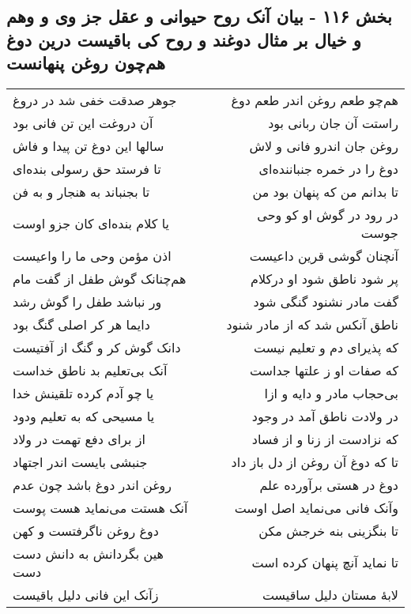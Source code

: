 \begin{center}
\section*{بخش ۱۱۶ - بیان آنک روح حیوانی و عقل جز وی و وهم و خیال بر مثال دوغند و روح کی باقیست درین دوغ هم‌چون روغن پنهانست}
\label{sec:sh116}
\begin{longtable}{l p{0.5cm} r}
جوهر صدقت خفی شد در دروغ
&&
هم‌چو طعم روغن اندر طعم دوغ
\\
آن دروغت این تن فانی بود
&&
راستت آن جان ربانی بود
\\
سالها این دوغ تن پیدا و فاش
&&
روغن جان اندرو فانی و لاش
\\
تا فرستد حق رسولی بنده‌ای
&&
دوغ را در خمره جنباننده‌ای
\\
تا بجنباند به هنجار و به فن
&&
تا بدانم من که پنهان بود من
\\
یا کلام بنده‌ای کان جزو اوست
&&
در رود در گوش او کو وحی جوست
\\
اذن مؤمن وحی ما را واعیست
&&
آنچنان گوشی قرین داعیست
\\
هم‌چنانک گوش طفل از گفت مام
&&
پر شود ناطق شود او درکلام
\\
ور نباشد طفل را گوش رشد
&&
گفت مادر نشنود گنگی شود
\\
دایما هر کر اصلی گنگ بود
&&
ناطق آنکس شد که از مادر شنود
\\
دانک گوش کر و گنگ از آفتیست
&&
که پذیرای دم و تعلیم نیست
\\
آنک بی‌تعلیم بد ناطق خداست
&&
که صفات او ز علتها جداست
\\
یا چو آدم کرده تلقینش خدا
&&
بی‌حجاب مادر و دایه و ازا
\\
یا مسیحی که به تعلیم ودود
&&
در ولادت ناطق آمد در وجود
\\
از برای دفع تهمت در ولاد
&&
که نزادست از زنا و از فساد
\\
جنبشی بایست اندر اجتهاد
&&
تا که دوغ آن روغن از دل باز داد
\\
روغن اندر دوغ باشد چون عدم
&&
دوغ در هستی برآورده علم
\\
آنک هستت می‌نماید هست پوست
&&
وآنک فانی می‌نماید اصل اوست
\\
دوغ روغن ناگرفتست و کهن
&&
تا بنگزینی بنه خرجش مکن
\\
هین بگردانش به دانش دست دست
&&
تا نماید آنچ پنهان کرده است
\\
زآنک این فانی دلیل باقیست
&&
لابهٔ مستان دلیل ساقیست
\\
\end{longtable}
\end{center}

